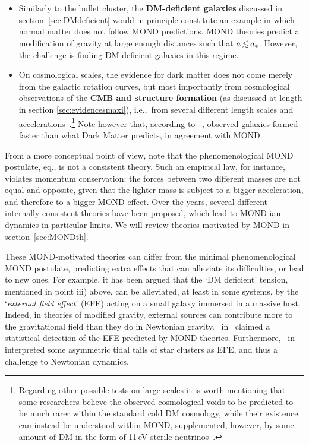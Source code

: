 \begin{itemize}
\item[iii)] Similarly to the bullet cluster, the {\bf DM-deficient galaxies} discussed in section~\ref{sec:DMdeficient} 
would in principle constitute an example in which normal matter does not follow MOND predictions. 
MOND theories predict a modification of gravity at large enough distances such that $a\circa{<} a_*$.
However, the challenge is finding DM-deficient galaxies in this regime.
 
\item[iv)] On cosmological scales,
the evidence for dark matter does not come merely from the galactic rotation curves, but most importantly from cosmological observations of the {\bf CMB and structure formation} (as discussed at length in section \ref{sec:evidencesmaxi}), i.e.,\ from several different length scales and accelerations~\cite{MONDcosmo}.\footnote{Regarding other possible tests on large scales it is worth mentioning that some researchers believe the observed cosmological
voids to be predicted to be much rarer within the standard cold DM cosmology, while their existence can instead be understood within MOND, supplemented, however, by some amount of DM in the form of 11\,eV sterile neutrinos~\cite{MONDfailuresandsuccesses}.} 
Note however that, according to ~\cite{JWSTearlygal}, 
observed galaxies formed faster than what Dark Matter predicts,
in agreement with MOND.



\end{itemize}
From a more conceptual point of view, note that the phenomenological MOND postulate, eq., is not a consistent theory. 
Such an empirical law, for instance, violates momentum conservation:
the forces between two different masses are not equal and opposite, given that the lighter mass is subject to a bigger acceleration,
and therefore to a bigger MOND effect. Over the years, several different internally consistent
theories have been proposed, which lead to 
MOND-ian dynamics in particular limits. We will review theories motivated by MOND in section~\ref{sec:MONDth}.

These MOND-motivated theories can differ from the minimal phenomenological MOND postulate, 
predicting extra effects that can alleviate its difficulties, or lead to new ones.
For example, it has been argued that  the `DM deficient'
tension, mentioned in point iii) above, can be alleviated, at least in some systems,
by the  `{\em external field effect}' (EFE) acting on a small galaxy immersed in a massive host.
Indeed, in theories of modified gravity, external sources can contribute more to the
gravitational field than they do in Newtonian gravity.
~in~\cite{MONDfailuresandsuccesses} claimed a statistical detection of the EFE
predicted by MOND theories.
Furthermore,  ~in \cite{MONDfailuresandsuccesses} interpreted some
asymmetric tidal tails of star clusters as EFE, and thus a challenge to Newtonian dynamics.

